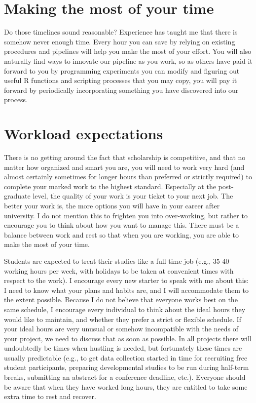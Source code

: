 \documentclass[
  12pt,
]{book}
\begin{document}
\section{Making the most of your time}\label{making-the-most-of-your-time}

Do those timelines sound reasonable? Experience has taught me that there is somehow never enough time. Every hour you can save by relying on existing procedures and pipelines will help you make the most of your effort. You will also naturally find ways to innovate our pipeline as you work, so as others have paid it forward to you by programming experiments you can modify and figuring out useful R functions and scripting processes that you may copy, you will pay it forward by periodically incorporating something you have discovered into our process.

\section{Workload expectations}\label{workload-expectations}

There is no getting around the fact that scholarship is competitive, and that no matter how organized and smart you are, you will need to work very hard (and almost certainly sometimes for longer hours than preferred or strictly required) to complete your marked work to the highest standard. Especially at the post-graduate level, the quality of your work is your ticket to your next job. The better your work is, the more options you will have in your career after university. I do not mention this to frighten you into over-working, but rather to encourage you to think about how you want to manage this. There must be a balance between work and rest so that when you are working, you are able to make the most of your time.

Students are expected to treat their studies like a full-time job (e.g., 35-40 working hours per week, with holidays to be taken at convenient times with respect to the work). I encourage every new starter to speak with me about this: I need to know what your plans and habits are, and I will accommodate them to the extent possible. Because I do not believe that everyone works best on the same schedule, I encourage every individual to think about the ideal hours they would like to maintain, and whether they prefer a strict or flexible schedule. If your ideal hours are very unusual or somehow incompatible with the needs of your project, we need to discuss that as soon as possible. In all projects there will undoubtedly be times when hustling is needed, but fortunately these times are usually predictable (e.g., to get data collection started in time for recruiting free student participants, preparing developmental studies to be run during half-term breaks, submitting an abstract for a conference deadline, etc.). Everyone should be aware that when they have worked long hours, they are entitled to take some extra time to rest and recover.
\end{document}
